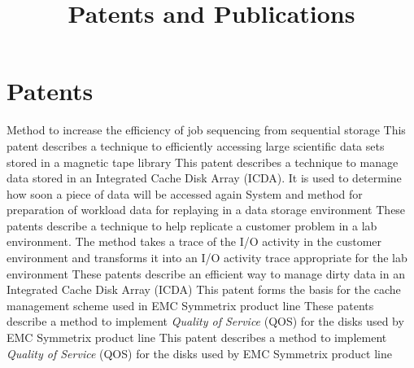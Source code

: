 \documentclass[10pt,a4paper,sans]{moderncv}
\title{Patents and Publications}
\begin{document}
\makecvtitle

\section{Patents}
                    {Method to increase the efficiency of job sequencing from sequential storage}
                    {This patent describes a technique to efficiently accessing large scientific data sets
                    stored in a magnetic tape library}{}{}{}
{This patent describes a technique to manage data stored in an Integrated Cache Disk Array (ICDA). It is used to determine 
how soon a piece of data will be accessed again}{}{}{}
                    {System and method for preparation of workload data for replaying in a data storage environment}
                    {These patents describe a technique to help replicate a customer problem in a lab environment. The
						method takes a trace of the I/O activity in the customer environment and transforms it into
                    an I/O activity trace appropriate for the lab environment}{}{}{}
{These patents describe an efficient way to manage dirty data in an Integrated Cache Disk Array (ICDA)}{}{}{}
{This patent forms the basis for the cache management scheme used in EMC Symmetrix product line}{}{}{}
{These patents describe a method to implement {\em Quality of Service} (QOS) for the disks used by EMC Symmetrix product line}{}{}{}
{This patent describes a method to implement {\em Quality of Service} (QOS) for the disks used by EMC Symmetrix product line}{}{}{}
\end{document}
